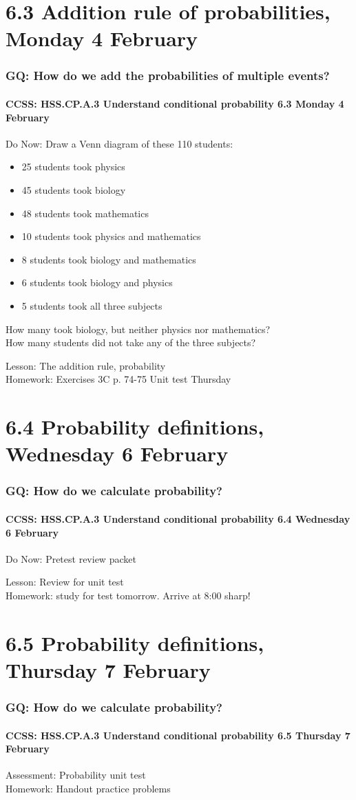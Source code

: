 \documentclass{beamer}
\begin{document}
\section{6.3 Addition rule of probabilities, Monday 4 February}
  \frame
  {
    \frametitle{GQ: How do we add the probabilities of multiple events?}
    \framesubtitle{CCSS: HSS.CP.A.3 Understand conditional probability \hfill \alert{6.3 Monday 4 February}}

    \begin{block}{Do Now: Draw a Venn diagram of these 110 students:}
      \begin{itemize}
        \item 25 students took physics
        \item 45 students took biology
        \item 48 students took mathematics
        \item 10 students took physics and mathematics
        \item 8 students took biology and mathematics
        \item 6 students took biology and physics
        \item 5 students took all three subjects
      \end{itemize}
      How many took biology, but neither physics nor mathematics?\\
      How many students did not take any of the three subjects?
    \end{block}
    Lesson: The addition rule, probability \\
    Homework: Exercises 3C p. 74-75 \alert{Unit test Thursday}
  }

  \section{6.4 Probability definitions, Wednesday 6 February}
    \frame
    {
      \frametitle{GQ: How do we calculate probability?}
      \framesubtitle{CCSS: HSS.CP.A.3 Understand conditional probability \hfill \alert{6.4 Wednesday 6 February}}

      \begin{block}{Do Now: Pretest review packet}
      \end{block}
      Lesson: Review for unit test \\ \bigskip
      Homework: study for \alert{test tomorrow}. Arrive at 8:00 sharp!
    }


\section{6.5 Probability definitions, Thursday 7 February}
  \frame
  {
    \frametitle{GQ: How do we calculate probability?}
    \framesubtitle{CCSS: HSS.CP.A.3 Understand conditional probability \hfill \alert{6.5 Thursday 7 February}}

    Assessment: Probability unit test \\ \bigskip
    Homework: Handout practice problems
  }
\end{document}
